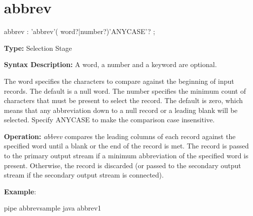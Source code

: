 \section{abbrev}
\begin{shaded}
\begin{rail}
  abbrev : 'abbrev'( word?|number?)'ANYCASE'?
  ;
\end{rail}
\end{shaded}

\textbf{Type:} Selection Stage

\textbf{Syntax Description:} A word, a number and a keyword are
optional.

The word specifies the characters to compare against the beginning of
input records. The default is a null word. The number specifies the
minimum count of characters that must be present to select the
record. The default is zero, which means that any abbreviation down to
a null record or a leading blank will be selected. Specify ANYCASE to
make the comparison case insensitive. 

\textbf{Operation:}  \emph{abbrev} compares the leading columns of
each record against the specified word until a blank or the end of the
record is met. The record is passed to the primary output stream if a
minimum abbreviation of the specified word is present. Otherwise, the
record is discarded (or passed to the secondary output stream if the
secondary output stream is connected).

\textbf{Example}:
 
\bash[stdout]
pipe abbrevsample
\END
\bash[stdout]
java abbrev1
\END
